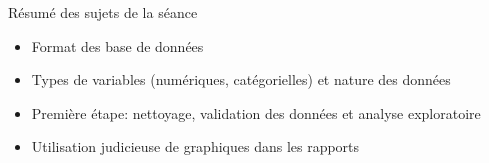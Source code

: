 \documentclass[
  ignorenonframetext,
]{beamer}
\providecommand{\tightlist}{%
  \setlength{\itemsep}{0pt}\setlength{\parskip}{0pt}}
\begin{document}
\begin{frame}{Résumé des sujets de la séance}
\protect{}\label{ruxe9sumuxe9-des-sujets-de-la-suxe9ance}
\begin{itemize}
\tightlist
\item
  Format des base de données
\item
  Types de variables (numériques, catégorielles) et nature des données
\item
  Première étape: nettoyage, validation des données et analyse
  exploratoire
\item
  Utilisation judicieuse de graphiques dans les rapports
\end{itemize}
\end{frame}
\end{document}

